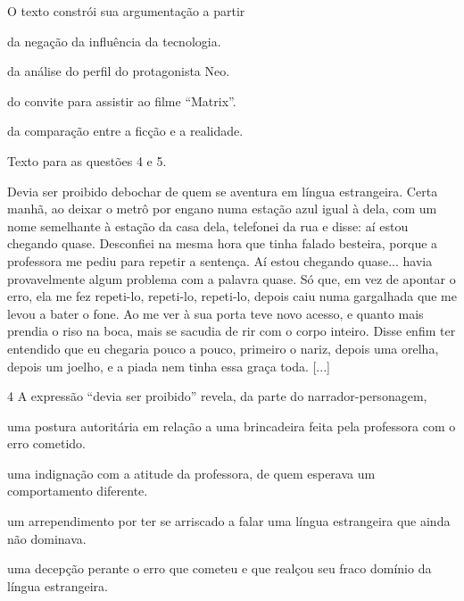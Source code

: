 O texto constrói sua argumentação a partir

\begin{escolha}
\item da negação da influência da tecnologia.

\item da análise do perfil do protagonista Neo.

\item do convite para assistir ao filme ``Matrix''.

\item da comparação entre a ficção e a realidade.
\end{escolha}

\pagebreak

Texto para as questões 4 e 5.

\begin{myquote}
[...] Devia ser proibido debochar de quem se aventura em língua estrangeira.
Certa manhã, ao deixar o metrô por engano numa estação azul igual à
dela, com um nome semelhante à estação da casa dela, telefonei da rua e
disse: aí estou chegando quase. Desconfiei na mesma hora que tinha
falado besteira, porque a professora me pediu para repetir a sentença.
Aí estou chegando quase... havia provavelmente algum problema com a
palavra quase. Só que, em vez de apontar o erro, ela me fez repeti-lo,
repeti-lo, repeti-lo, depois caiu numa gargalhada que me levou a bater o
fone. Ao me ver à sua porta teve novo acesso, e quanto mais prendia o
riso na boca, mais se sacudia de rir com o corpo inteiro. Disse enfim
ter entendido que eu chegaria pouco a pouco, primeiro o nariz, depois
uma orelha, depois um joelho, e a piada nem tinha essa graça toda. [...]

\end{myquote}

\num{4} A expressão ``devia ser proibido'' revela, da parte do
narrador-personagem,

\begin{escolha}
\item uma postura autoritária em relação a uma brincadeira feita pela
professora com o erro cometido.

\item uma indignação com a atitude da professora, de quem esperava um
comportamento diferente.

\item um arrependimento por ter se arriscado a falar uma língua estrangeira
que ainda não dominava.

\item uma decepção perante o erro que cometeu e que realçou seu fraco
domínio da língua estrangeira.
\end{escolha}

